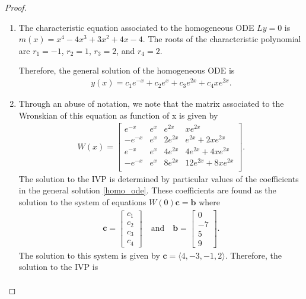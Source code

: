 \documentclass[12pt]{article}
\theoremstyle{definition}
\newcommand{\vect}[1]{\boldsymbol{#1}}
\begin{document}
\begin{proof}
  \begin{enumerate}
    \item The characteristic equation associated to the homogeneous ODE $Ly=0$
      is $m(x) = x^4 - 4 x^3 + 3x^2 + 4x - 4$. The roots of the characteristic
      polynomial are $r_1 = -1$, $r_2=1$, $r_3=2$, and $r_4=2$.

      Therefore, the general solution of the homogeneous ODE is
      \begin{align}\label{homo_ode}
        y(x) = c_1 e^{-x} + c_2 e^{x} + c_3e^{2x} +c_4xe^{2x}.
      \end{align}
    \item Through an abuse of notation, we note that the matrix associated to the Wronskian
      of this equation as function of x is given by
      \begin{align*}
        W(x) =
        \begin{bmatrix}
          e^{-x} & e^{x} & e^{2x} & xe^{2x} \\
          -e^{-x} & e^{x} & 2e^{2x} & e^{2x} + 2xe^{2x} \\
          e^{-x} & e^{x} & 4e^{2x} & 4e^{2x} + 4xe^{2x} \\
          -e^{-x} & e^{x} & 8e^{2x} & 12e^{2x} + 8xe^{2x} \\
        \end{bmatrix}.
      \end{align*}
      The solution to the IVP is determined by particular values of the coefficients in the
      general solution \eqref{homo_ode}. These coefficients are found as the
      solution to the system of equations
      $W(0)\vect{c} = \vect{b}$ where
      \begin{align*}
        \vect{c} = \begin{bmatrix}c_1 \\ c_2 \\ c_3 \\ c_4 \end{bmatrix}\quad\text{and}\quad
        \vect{b} = \begin{bmatrix} 0 \\ -7 \\ 5 \\ 9 \end{bmatrix}.
      \end{align*}
      The solution to this system is given by $\vect{c} = \langle 4,-3,-1,2 \rangle$.
      Therefore, the solution to the IVP is
      \begin{align*}

\end{align*}
\end{enumerate}
\end{proof}
\end{document}
